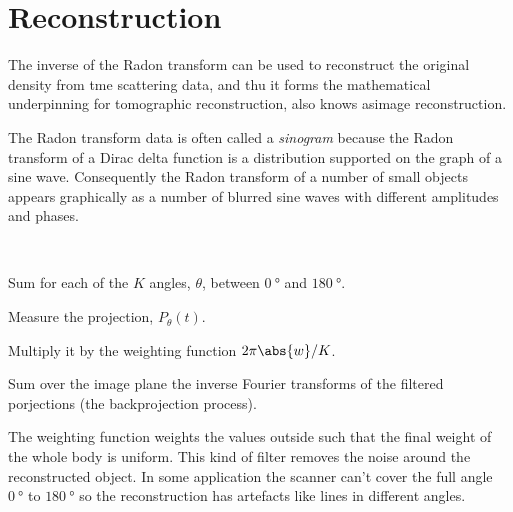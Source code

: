 \section{Reconstruction}
\begin{compactdesc}
\item[\lp{General}]
The inverse of the Radon transform can be used to reconstruct the original density from tme scattering data, and thu it forms the mathematical underpinning for tomographic reconstruction, also knows asimage reconstruction. 
\item[\lp{Sinogram}] The Radon transform data is often called a \emph{sinogram} because the Radon transform of a Dirac delta function is a distribution supported on the graph of a sine wave. Consequently the Radon transform of a number of small objects appears graphically as a number of blurred sine waves with different amplitudes and phases.
\item[\lp{Filtered backprojection algorithm}]\hfill\\
	\begin{enumerate*}[label=\protect\circled{\arabic*},itemjoin=]
		\item Sum for each of the $K$ angles, $\theta$, between $\SI{0}{\degree}$ and $\SI{180}{\degree}$. \\
		\item Measure the projection, $P_{\theta}(t)$.\\
		\item Multiply it by the weighting function $2\pi\abs{w}/K$.\\
		\item Sum over the image plane the inverse Fourier transforms of the filtered porjections (the backprojection process).
	\end{enumerate*}
	The weighting function weights the values outside such that the final weight of the whole body is uniform.
	This kind of filter removes the noise around the reconstructed object. In some application the scanner can't cover the full angle $\SI{0}{\degree}$ to $\SI{180}{\degree}$ so the reconstruction has artefacts like lines in different angles. 
\end{compactdesc}
